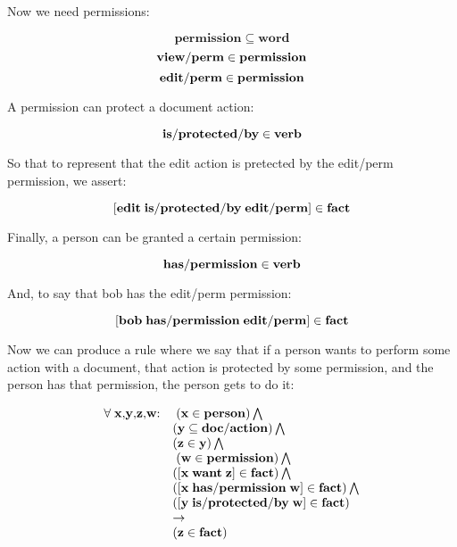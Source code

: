 \documentclass{IOS-Book-Article}     %
\begin{document}
Now we need permissions:

\begin{equation}
  \mathbf{permission \subseteq word}
\end{equation}
\begin{equation}
  \mathbf{view\-/perm \in permission}
\end{equation}
\begin{equation}
  \mathbf{edit\-/perm \in permission}
\end{equation}

A permission can protect a document action:

\begin{equation}
  \mathbf{is\-/protected\-/by \in verb}
\end{equation}

So that to represent that the edit action is pretected by the edit\-/perm permission,
we assert:

\begin{equation}
  \mathbf{\left[edit\; is\-/protected\-/by\; edit\-/perm\right] \in fact}
\end{equation}

Finally, a person can be granted a certain permission:

\begin{equation}
  \mathbf{has\-/permission \in verb}
\end{equation}

And, to say that bob has the edit\-/perm permission:

\begin{equation}
  \mathbf{\left[bob\; has\-/permission\; edit\-/perm\right] \in fact}
\end{equation}

Now we can produce a rule where we say that if a person
wants to perform some action with a document,
that action is protected by some permission,
and the person has that permission,
the person gets to do it:

\begin{equation}
  \begin{array}{ll}  \forall\;\mathbf{x}\mathrm{,}\mathbf{y}\mathrm{,}\mathbf{z}\mathrm{,}\mathbf{w}\mathrm{:} & \;\mathbf{\left(x \in person\right)}\bigwedge \\ {} &  \mathbf{\left(y \subseteq doc\-/action\right)}\bigwedge \\ {} &  \mathbf{\left(z \in y\right)}\bigwedge \\ {} &  \;\mathbf{\left(w \in permission\right)}\bigwedge \\ {} & \mathbf{\left(\left[x\; want\; z\right] \in fact\right)}\bigwedge \\ {} &  \mathbf{\left(\left[x\; has\-/permission\; w\right] \in fact\right)}\bigwedge \\ {} &  \mathbf{\left(\left[y\; is\-/protected\-/by\; w\right] \in fact\right)} \\ {} &  \rightarrow \\ {} &  \mathbf{\left(z \in fact\right)}\end{array}
\end{equation}
\end{document}
